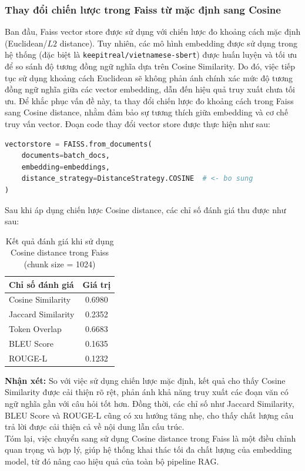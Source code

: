 \subsubsection{Thay đổi chiến lược trong Faiss từ mặc định sang Cosine}

Ban đầu, Faiss vector store được sử dụng với chiến lược đo khoảng cách mặc định (Euclidean/$L2$ distance). Tuy nhiên, các mô hình embedding được sử dụng trong hệ thống (đặc
biệt là \texttt{keepitreal/vietnamese-sbert}) được huấn luyện và tối ưu để so sánh độ tương đồng
ngữ nghĩa dựa trên Cosine Similarity.
Do đó, việc tiếp tục sử dụng khoảng cách Euclidean sẽ không phản ánh chính xác mức độ
tương đồng ngữ nghĩa giữa các vector embedding, dẫn đến hiệu quả truy xuất chưa tối ưu. Để
khắc phục vấn đề này, ta thay đổi chiến lược đo khoảng cách trong Faiss sang Cosine distance,
nhằm đảm bảo sự tương thích giữa embedding và cơ chế truy vấn vector.
Đoạn code thay đổi vector store được thực hiện như sau:
\begin{lstlisting}[language=Python, caption={Thay đổi distance strategy trong FAISS sang Cosine}]
vectorstore = FAISS.from_documents(
    documents=batch_docs,
    embedding=embeddings,
    distance_strategy=DistanceStrategy.COSINE  # <- bo sung
)
\end{lstlisting}
Sau khi áp dụng chiến lược Cosine distance, các chỉ số đánh giá thu được như sau:
\begin{table}[H]
\centering
\caption{Kết quả đánh giá khi sử dụng Cosine distance trong Faiss (chunk size = 1024)}
\begin{tabular}{lc}
  \toprule
  \textbf{Chỉ số đánh giá} & \textbf{Giá trị} \\
  \midrule
  Cosine Similarity  & 0.6980 \\
  Jaccard Similarity & 0.2352 \\
  Token Overlap      & 0.6683 \\
  BLEU Score         & 0.1635 \\
  ROUGE-L            & 0.1232 \\
  \bottomrule
\end{tabular}
\end{table}
\textbf{Nhận xét:} So với việc sử dụng chiến lược mặc định, kết quả cho thấy Cosine Similarity được cải thiện
rõ rệt, phản ánh khả năng truy xuất các đoạn văn có ngữ nghĩa gần với câu hỏi tốt hơn. Đồng thời, các chỉ số như Jaccard Similarity, BLEU Score và ROUGE-L cũng có xu hướng tăng nhẹ,
cho thấy chất lượng câu trả lời được cải thiện cả về nội dung lẫn cấu trúc.\\
Tóm lại, việc chuyển sang sử dụng Cosine distance trong Faiss là một điều chỉnh quan trọng
và hợp lý, giúp hệ thống khai thác tối đa chất lượng của embedding model, từ đó nâng cao hiệu
quả của toàn bộ pipeline RAG.
